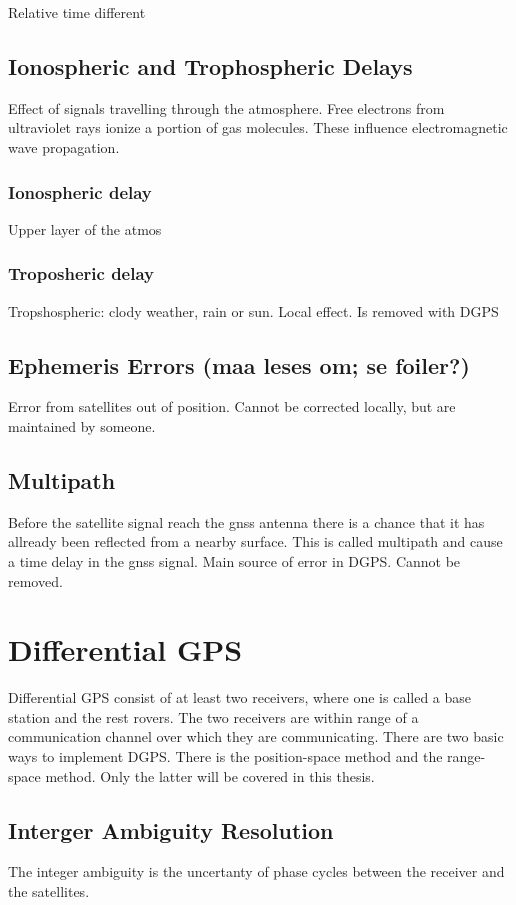 Relative time different
\subsection{Ionospheric and Trophospheric Delays}
Effect of signals travelling through the atmosphere. Free electrons from ultraviolet rays ionize a portion of gas molecules. These influence electromagnetic wave propagation.
\subsubsection{Ionospheric delay}
Upper layer of the atmos

\subsubsection{Troposheric delay}


Tropshospheric: clody weather, rain or sun. Local effect. Is removed with DGPS
\subsection{Ephemeris Errors (maa leses om; se foiler?)}
Error from satellites out of position. Cannot be corrected locally, but are maintained by someone.
\subsection{Multipath}
Before the satellite signal reach the gnss antenna there is a chance that it has allready been reflected from a nearby surface. This is called multipath and cause a time delay in the gnss signal. 
Main source of error in DGPS. Cannot be removed.
\section{Differential GPS}
Differential GPS consist of at least two receivers, where one is called a base station and the rest rovers. The two receivers are within range of a communication channel over which they are communicating. There are two basic ways to implement DGPS. There is the position-space method and the range-space method. Only the latter will be covered in this thesis.
\subsection{Interger Ambiguity Resolution}
The integer ambiguity is the uncertanty of phase cycles between the receiver and the satellites.

